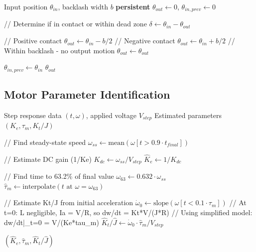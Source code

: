 \begin{algorithm}
\caption{Backlash Model with Hysteresis}
\begin{algorithmic}[1]
\REQUIRE Input position $\theta_{in}$, backlash width $b$
\STATE \textbf{persistent} $\theta_{out} \gets 0$, $\theta_{in,prev} \gets 0$

\STATE // Determine if in contact or within dead zone
\STATE $\delta \gets \theta_{in} - \theta_{out}$

    \STATE // Positive contact
    \STATE $\theta_{out} \gets \theta_{in} - b/2$
    \STATE // Negative contact
    \STATE $\theta_{out} \gets \theta_{in} + b/2$
\ELSE
    \STATE // Within backlash - no output motion
    \STATE $\theta_{out} \gets \theta_{out}$ 
\ENDIF

\STATE $\theta_{in,prev} \gets \theta_{in}$
\RETURN $\theta_{out}$
\end{algorithmic}
\end{algorithm}

\subsection{Motor Parameter Identification}

\begin{algorithm}
\caption{DC Motor Parameter Estimation from Step Response}
\begin{algorithmic}[1]
\REQUIRE Step response data $(t, \omega)$, applied voltage $V_{step}$
\ENSURE Estimated parameters $(K_e, \tau_m, K_t/J)$

\STATE // Find steady-state speed
\STATE $\omega_{ss} \gets \text{mean}(\omega[t > 0.9 \cdot t_{final}])$

\STATE // Estimate DC gain (1/Ke)
\STATE $K_{dc} \gets \omega_{ss} / V_{step}$
\STATE $\hat{K}_e \gets 1 / K_{dc}$

\STATE // Find time to 63.2\% of final value
\STATE $\omega_{63} \gets 0.632 \cdot \omega_{ss}$
\STATE $\hat{\tau}_m \gets \text{interpolate}(t \text{ at } \omega = \omega_{63})$

\STATE // Estimate Kt/J from initial acceleration
\STATE $\dot{\omega}_0 \gets \text{slope}(\omega[t < 0.1 \cdot \tau_m])$
\STATE // At t=0: L negligible, Ia = V/R, so dw/dt = Kt*V/(J*R)
\STATE // Using simplified model: dw/dt|_{t=0} = V/(Ke*tau_m)
\STATE $\hat{K}_t / \hat{J} \gets \dot{\omega}_0 \cdot \hat{\tau}_m / V_{step}$

\RETURN $(\hat{K}_e, \hat{\tau}_m, \hat{K}_t / \hat{J})$
\end{algorithmic}
\end{algorithm}

